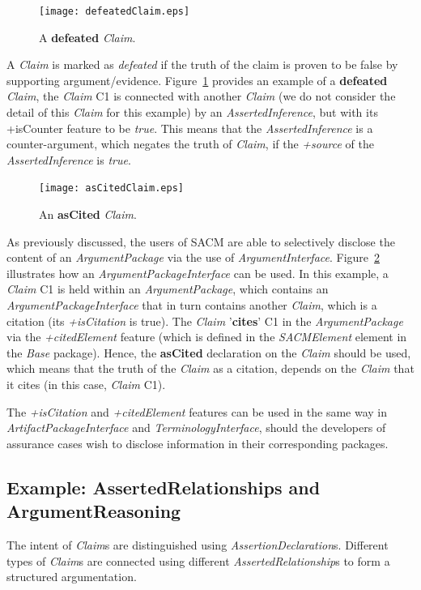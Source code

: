 \begin{figure}
	\centering
	\texttt{[image: defeatedClaim.eps]}
	\caption{A \textbf{defeated} \textit{Claim}.}
	\label{fig:defeatedClaim}
\end{figure}
A \textit{Claim} is marked as \textit{defeated} if the truth of the claim is proven to be false by supporting argument/evidence. Figure~\ref{fig:defeatedClaim} provides an example of a \textbf{defeated} \textit{Claim}, the \textit{Claim} C1 is connected with another \textit{Claim} (we do not consider the detail of this \textit{Claim} for this example) by an \textit{AssertedInference}, but with its +isCounter feature to be \textit{true}. This means that the \textit{AssertedInference} is a counter-argument, which negates the truth of \textit{Claim}, if the \textit{+source} of the \textit{AssertedInference} is \textit{true}.

\begin{figure}
	\centering
	\texttt{[image: asCitedClaim.eps]}
	\caption{An \textbf{asCited} \textit{Claim}.}
	\label{fig:asCited}
\end{figure}

As previously discussed, the users of SACM are able to selectively disclose the content of an \textit{ArgumentPackage} via the use of \textit{ArgumentInterface}. Figure~\ref{fig:asCited} illustrates how an \textit{ArgumentPackageInterface} can be used. In this example, a \textit{Claim} C1 is held within an \textit{ArgumentPackage}, which contains an \textit{ArgumentPackageInterface} that in turn contains another \textit{Claim}, which is a citation (its \textit{+isCitation} is true). The \textit{Claim} '\textbf{cites}' C1 in the \textit{ArgumentPackage} via the \textit{+citedElement} feature (which is defined in the \textit{SACMElement} element in the \textit{Base} package). Hence, the \textbf{asCited} declaration on the \textit{Claim} should be used, which means that the truth of the \textit{Claim} as a citation, depends on the \textit{Claim} that it cites (in this case, \textit{Claim} C1).

The \textit{+isCitation} and \textit{+citedElement} features can be used in the same way in \textit{ArtifactPackageInterface} and \textit{TerminologyInterface}, should the developers of assurance cases wish to disclose information in their corresponding packages.

\label{sec:confidence}
\subsection{Example: AssertedRelationships and ArgumentReasoning}
\label{sec:relationships}
The intent of \textit{Claim}s are distinguished using \textit{AssertionDeclaration}s. 
Different types of \textit{Claim}s are connected using different \textit{AssertedRelationship}s to form a structured argumentation. 

